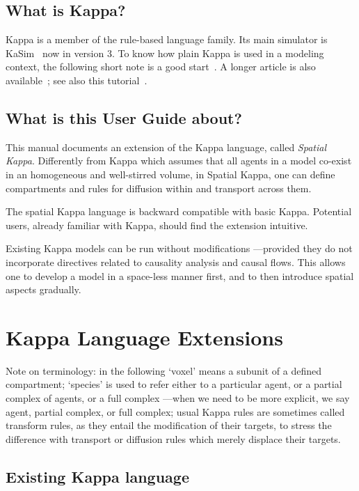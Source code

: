 \documentclass[english]{report}
\begin{document}
\section*{What is Kappa?}
Kappa is a member of the rule-based language family. Its main simulator is KaSim~\citep{KaSimManual2012} now in version 3. To know how plain Kappa is used in a modeling context, the following short note is a good start~\citep{sos08}. A longer article is also available~\citep{concur07}; see also this tutorial~\citep{cav09}.


\section*{What is this User Guide about?}
This manual documents an extension of the Kappa language, called \emph{Spatial Kappa}. Differently from Kappa which assumes that all agents in a model co-exist in an homogeneous and well-stirred volume, in Spatial Kappa, one can define compartments and rules for diffusion within and transport across them. 

The spatial Kappa language %
is backward compatible with basic Kappa. Potential users, already familiar with Kappa, should find the extension intuitive.

Existing Kappa models can be run without modifications
---provided they do not incorporate directives related to causality analysis and causal flows.
This allows one to develop a model in a space-less manner first, and to then introduce spatial aspects gradually.

\chapter{Kappa Language Extensions}
Note on terminology: in the following `voxel' means a subunit of a defined compartment;
`species' is used to refer either to a particular agent, or a partial complex of agents, or a full complex ---when we need to be more explicit, we say agent, partial complex, or full complex; usual Kappa rules
are sometimes called transform rules, as they entail the modification of their targets, to stress the difference with transport or diffusion rules which merely displace their targets.


\section{Existing Kappa language}
\end{document}
